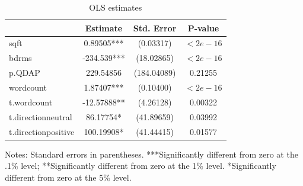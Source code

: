 \documentclass[12pt,english]{article}
\begin{document}
\begin{table}[ht]
\caption{OLS estimates}
\label{tab:estimates} 
\centering
\begin{threeparttable}
\begin{tabular}{lccc}
\toprule
                            & Estimate    & Std. Error & P-value \\
\midrule
sqft        & 0.89505***   & (0.03317)    & $<2e-16$    \\
bdrms  & -234.539***   & (18.02865)   & $<2e-16$ \\
p.QDAP        &      229.54856 & (184.04089)  & 0.21255 \\
wordcount     &    1.87407***  & (0.10400)    & $<2e-16$\\
t.wordcount & -12.57888**  & (4.26128) & 0.00322 \\
t.directionneutral & 86.17754* & (41.89659) & 0.03992 \\
t.directionpositive & 100.19908* & (41.44415) & 0.01577 \\
\bottomrule
\end{tabular}
\footnotesize Notes: Standard errors in parentheses. ***Significantly different from zero at the .1\% level; **Significantly different from zero at the 1\% level. *Significantly different from zero at the 5\% level. 
\end{threeparttable}
\end{table}
\end{document}
